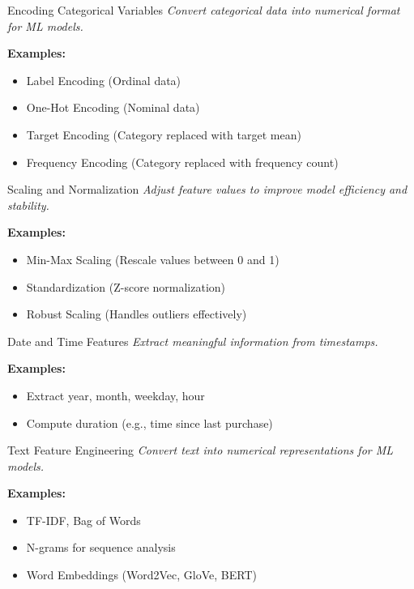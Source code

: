 \documentclass{beamer}
\begin{document}
\begin{frame}{Encoding Categorical Variables}
  \textit{Convert categorical data into numerical format for ML models.}  

  \textbf{Examples:}  
  \begin{itemize}
    \item Label Encoding (Ordinal data)
    \item One-Hot Encoding (Nominal data)
    \item Target Encoding (Category replaced with target mean)
    \item Frequency Encoding (Category replaced with frequency count)
  \end{itemize}
\end{frame}

\begin{frame}{Scaling and Normalization}
  \textit{Adjust feature values to improve model efficiency and stability.}  

  \textbf{Examples:}  
  \begin{itemize}
    \item Min-Max Scaling (Rescale values between 0 and 1)
    \item Standardization (Z-score normalization)
    \item Robust Scaling (Handles outliers effectively)
  \end{itemize}
\end{frame}

\begin{frame}{Date and Time Features}
  \textit{Extract meaningful information from timestamps.}  

  \textbf{Examples:}  
  \begin{itemize}
    \item Extract year, month, weekday, hour
    \item Compute duration (e.g., time since last purchase)
  \end{itemize}
\end{frame}

\begin{frame}{Text Feature Engineering}
  \textit{Convert text into numerical representations for ML models.}  

  \textbf{Examples:}  
  \begin{itemize}
    \item TF-IDF, Bag of Words
    \item N-grams for sequence analysis
    \item Word Embeddings (Word2Vec, GloVe, BERT)
  \end{itemize}
\end{frame}
\end{document}
